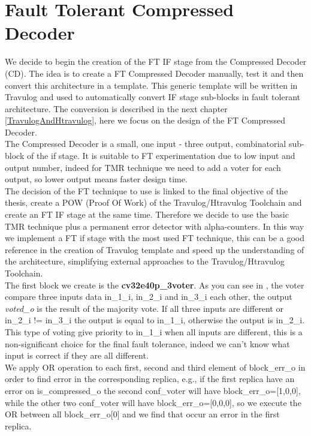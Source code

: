 \chapter{Fault Tolerant Compressed Decoder}{
	We decide to begin the creation of the FT IF stage from the Compressed Decoder (CD).
	The idea is to create a FT Compressed Decoder  manually, test it and then convert this architecture in a template.   
	This generic template will be written in Travulog and used to automatically convert IF stage sub-blocks in fault tolerant architecture.
	The conversion is described in the next chapter \ref{TravulogAndHtravulog}, here we focus on the design of the FT Compressed Decoder. \\
	
	
		The Compressed Decoder is a small, one input - three output, combinatorial sub-block of the if stage. 
		It is suitable to FT experimentation due to low input and output number, indeed  for TMR technique we need to add a voter for each output, so lower output means faster design time.\\
		
		The decision of the FT technique to use is linked to the final objective of the thesis, create a POW (Proof Of Work) of the Travulog/Htravulog Toolchain and create an FT IF stage at the same time.
		Therefore we decide to use the basic TMR technique plus a permanent error detector with alpha-counters.
		In this way we implement a FT if stage with the most used FT technique, this can be a good reference in the creation of Travulog template and speed up the understanding of the architecture, simplifying external approaches to the Travulog/Htravulog Toolchain.\\
		
		The first block we create is the \textbf{cv32e40p\_3voter}. 
		As you can see in , the voter compare three inputs data in\_1\_i, in\_2\_i and in\_3\_i each other, the output \textit{voted\_o} is the result of the majority vote. 
		If all three inputs are different or in\_2\_i != in\_3\_i the output is equal to in\_1\_i, otherwise the output is in\_2\_i. 
		This type of voting give priority to in\_1\_i when all inputs are different, this is a non-significant choice for the final fault tolerance, indeed we can't know what input is correct if they are all different.\\
		
        We apply OR operation to each first, second and third element of block\_err\_o in order to find error in the corresponding replica, e.g., if the first replica have an error on is\_compressed\_o the second conf\_voter will have block\_err\_o=[1,0,0], while the other two conf\_voter will have block\_err\_o=[0,0,0], so we execute the OR between all block\_err\_o[0] and we find that occur an error in the first replica.\\
        
}
